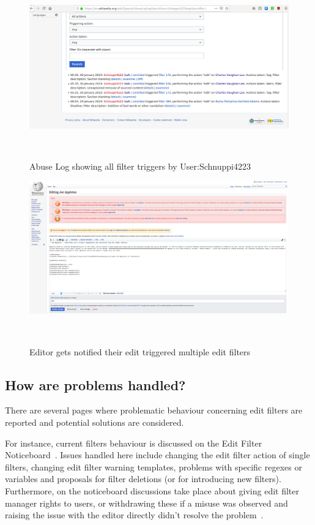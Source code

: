 \begin{figure}
\centering
  \includegraphics[width=0.9\columnwidth]{pics/screenshots-filter-trigger/Screenshot-abuse-log.png}
  \caption{Abuse Log showing all filter triggers by User:Schnuppi4223}~\label{fig:screenshot-abuse-log}
\end{figure}

\begin{figure}
\centering
  \includegraphics[width=0.9\columnwidth]{pics/screenshots-filter-trigger/Screenshot-trigger-warning-filter.png}
  \caption{Editor gets notified their edit triggered multiple edit filters}~\label{fig:screenshot-warn-disallow}
\end{figure}


\subsection{How are problems handled?}

There are several pages where problematic behaviour concerning edit filters are reported and potential solutions are considered.

For instance, current filters behaviour is discussed on the Edit Filter Noticeboard~\cite{Wikipedia:EditFilterNoticeboard}.
Issues handled here include changing the edit filter action of single filters, changing edit filter warning templates, problems with specific regexes or variables and proposals for filter deletions (or for introducing new filters).
Furthermore, on the noticeboard discussions take place about giving edit filter manager rights to users, or withdrawing these if a misuse was observed and raising the issue with the editor directly didn't resolve the problem~\cite{Wikipedia:EditFilter}.


